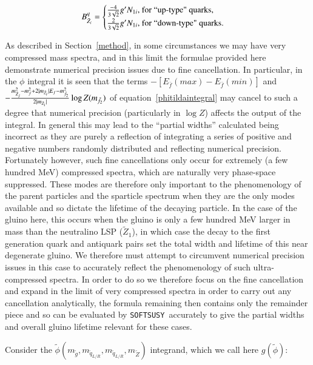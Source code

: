 \documentclass[final,3p,times]{elsarticle}
\def\SOFTSUSY{{\tt SOFTSUSY}}
\begin{document}
\begin{equation}
B_{{\tilde{Z}_i}}^{q} = \begin{cases} 
						{-4 \over 3 \sqrt{2}} g'N_{1i}$, for ``up-type" quarks,$ \\
						{2 \over 3 \sqrt{2}} g' N_{1i}$, for ``down-type" quarks$.
                                              \end{cases}
\end{equation}

As described in Section~\ref{method}, in some circumstances we may have very
compressed mass spectra, and in this limit the formulae provided here
demonstrate numerical precision issues due to fine cancellation. In
particular, in the $\phi$ integral it is seen that the terms
$-[E_{\bar{f}}(max) - E_{\bar{f}}(min)]$ and $-{m_{\tilde{Z}_j}^2 - m_{f}^2 +
  2|m_{\tilde{Z}_i}|E_f - m_{\tilde{f}_2}^2 \over 2|m_{\tilde{Z}_i}|} \log
Z(m_{\tilde{f}_2})$ of equation~\ref{phitildaintegral} may cancel to such a
degree that numerical precision (particularly in $\log Z$) affects the output
of the integral. In general this may lead to the ``partial widths'' calculated
being incorrect as they are purely a reflection of integrating a series of
positive and negative numbers randomly distributed and reflecting numerical
precision. Fortunately however, such fine cancellations only occur for
extremely (a few hundred MeV) compressed spectra, which are naturally very phase-space
suppressed. These modes are therefore only important to the phenomenology of
the parent particles and the sparticle spectrum when they are the only modes
available and so dictate the lifetime of the decaying particle. In the case of
the gluino here, this occurs when the gluino is only a few hundred MeV larger
in mass than the neutralino LSP ($\tilde{Z}_1$), in which case the decay to
the first generation quark and antiquark pairs set the total width and
lifetime of this near degenerate gluino. We therefore must attempt to
circumvent numerical precision issues in this case to accurately reflect the
phenomenology of such ultra-compressed spectra. In order to do so we therefore focus on the fine cancellation and expand in the limit of very compressed spectra in order to carry out any cancellation analytically, the formula remaining then contains only the remainder piece and so can be evaluated by \SOFTSUSY~accurately to give the partial widths and overall gluino lifetime relevant for these cases.
\vspace{0.5cm}

Consider the $\tilde{\phi}(m_{\tilde{g}},m_{\tilde{q}_{L/R}},m_{\tilde{q}_{L/R}},m_{\tilde{Z}})$ integrand, which we call here $g(\tilde{\phi})$:
\end{document}
